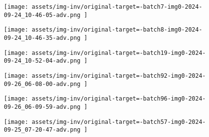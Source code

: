 \begin{figure*}[t]
    \vspace{1mm}
    \begin{minipage}[t]{.025\textwidth}
         \vspace{11mm}
    \end{minipage}%
    \begin{minipage}[t]{.98\textwidth}
        \vspace{0pt}
            \begin{subfigure}[t]{0.16\textwidth}
                    \texttt{[image:  assets/img-inv/original-target=-batch7-img0-2024-09-24\_10-46-05-adv.png ]}
            \end{subfigure}%
                \hspace{0.5mm}%
            \begin{subfigure}[t]{0.16\textwidth}
                    \texttt{[image:  assets/img-inv/original-target=-batch8-img0-2024-09-24\_10-46-35-adv.png ]}
            \end{subfigure}%
                \hspace{0.5mm}%
            \begin{subfigure}[t]{0.16\textwidth}
                    \texttt{[image:  assets/img-inv/original-target=-batch19-img0-2024-09-24\_10-52-04-adv.png ]}
            \end{subfigure}%
                \hspace{0.5mm}%
            \begin{subfigure}[t]{0.16\textwidth}
                    \texttt{[image:  assets/img-inv/original-target=-batch92-img0-2024-09-26\_06-08-00-adv.png ]}
            \end{subfigure}%
                \hspace{0.5mm}%
            \begin{subfigure}[t]{0.16\textwidth}
                    \texttt{[image:  assets/img-inv/original-target=-batch96-img0-2024-09-26\_06-09-59-adv.png ]}
            \end{subfigure}%
                \hspace{0.5mm}%
            \begin{subfigure}[t]{0.16\textwidth}
                    \texttt{[image:  assets/img-inv/original-target=-batch57-img0-2024-09-25\_07-20-47-adv.png ]}
            \end{subfigure}%
    \end{minipage}


\end{figure*}
